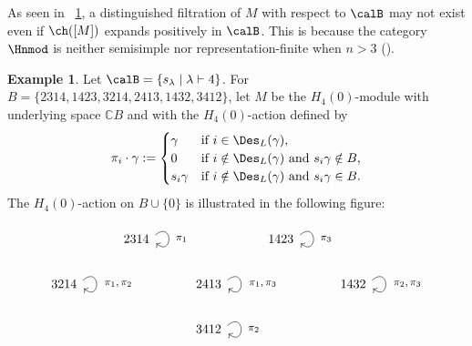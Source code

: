 \documentclass[12pt, reqno]{amsart}
\theoremstyle{definition}
\newtheorem{example}[theorem]{Example}
\numberwithin{equation}{section} \numberwithin{figure}{section}
\numberwithin{table}{section}
\def\C{\mathbb C}
\begin{document}
As seen in ~\cref{eg: not dist filt},
a distinguished filtration of $M$ with respect to $\calB$ may not exist even if $\ch([M])$ expands positively in $\calB$.
This is because the category  $\Hnmod$ is  neither semisimple nor representation-finite when $n > 3$ (\cite{11DY, 02DHT}).  


\begin{example}\label{eg: not dist filt}
Let $\calB = \{s_\lambda \mid \lambda \vdash 4 \}$.
For $B = \{2314, 1423, 3214,2413, 1432, 3412\}$,
let $M$ be the $H_4(0)$-module with underlying space $\C B$ and with the $H_4(0)$-action defined by
\begin{align*}
\pi_{i} \cdot \gamma :=
\begin{cases}
\gamma & \text{if $i \in \Des_L(\gamma)$}, \\
0 & \text{if $i \notin \Des_L(\gamma)$ and $s_i\gamma \notin B$,} \\
s_i \gamma & \text{if $i \notin \Des_L(\gamma)$ and $s_i\gamma \in B$}.
\end{cases} 
\end{align*}
The $H_4(0)$-action on $B \cup \{ 0 \}$  is illustrated in the following figure:
\[
\def \vp {1.25}
\def \hp {2}
\begin{tikzpicture}
\node[] at (0*\hp, 0*\vp) {$3412$};

\node[] at (0*\hp, 1*\vp) {$2413$};
\node[] at (-2*\hp, 1*\vp) {$3214$};
\node[] at (2*\hp, 1*\vp) {$1432$};

\node[] at (-1*\hp, 2*\vp) {$2314$};
\node[] at (1*\hp, 2*\vp) {$1423$};

\node at (0*\hp + 0.2*\hp, 0*\vp) {} edge [out=40,in=320, loop] ();
\node at (0*\hp + 0.625*\hp, 0*\vp) {\footnotesize $\pi_2$};

\node at (-2*\hp + 0.2*\hp, 1*\vp) {} edge [out=40,in=320, loop] ();
\node at (-2*\hp + 0.75*\hp, 1*\vp) {\footnotesize $\pi_1, \pi_2$};

\node at (0*\hp + 0.2*\hp, 1*\vp) {} edge [out=40,in=320, loop] ();
\node at (0*\hp + 0.75*\hp, 1*\vp) {\footnotesize $\pi_1, \pi_3$};

\node at (2*\hp + 0.2*\hp, 1*\vp) {} edge [out=40,in=320, loop] ();
\node at (2*\hp + 0.75*\hp, 1*\vp) {\footnotesize $\pi_2, \pi_3$};

\node at (-1*\hp + 0.2*\hp, 2*\vp) {} edge [out=40,in=320, loop] ();
\node at (-1*\hp + 0.625*\hp, 2*\vp) {\footnotesize $\pi_1$};

\node at (1*\hp + 0.2*\hp, 2*\vp) {} edge [out=40,in=320, loop] ();
\node at (1*\hp + 0.625*\hp, 2*\vp) {\footnotesize $\pi_3$};


\end{tikzpicture}\]
\end{example}
\end{document}
